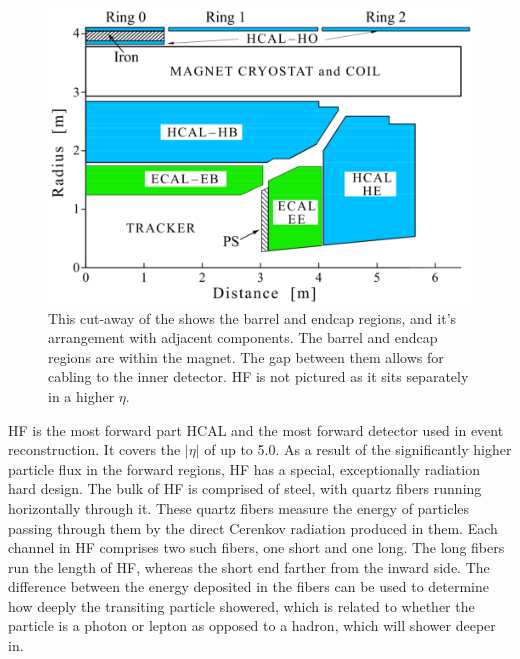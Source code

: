 \begin{figure}[!htbp]
    \centering
    \includegraphics[width=\textwidth]{figures/HCAL.png}
    \caption[
       \CMS \HCAL diagram.
    ]{
        This cut-away of the \HCAL shows the barrel and endcap regions, and it's arrangement with adjacent \CMS components.  The barrel and endcap regions are within the magnet. The gap between them allows for cabling to the inner detector. HF is not pictured as it sits separately in a higher \ensuremath{\eta}. \cite{HCALperf}
    }
    \label{fig:hcal}
\end{figure}

HF is the most forward part HCAL and the most forward detector used in event reconstruction.  It covers the \ensuremath{|\eta|} of up to 5.0.  As a result of the significantly higher particle flux in the forward regions, HF has a special, exceptionally radiation hard design. The bulk of HF is comprised of steel, with quartz fibers running horizontally through it.  These quartz fibers measure the energy of particles passing through them by the direct Cerenkov radiation produced in them. Each channel in HF comprises two such fibers, one short and one long. The long fibers run the length of HF, whereas the short end farther from the inward side.  The difference between the energy deposited in the fibers can be used to determine how deeply the transiting particle showered, which is related to whether the particle is a photon or lepton as opposed to a hadron, which will shower deeper in.

